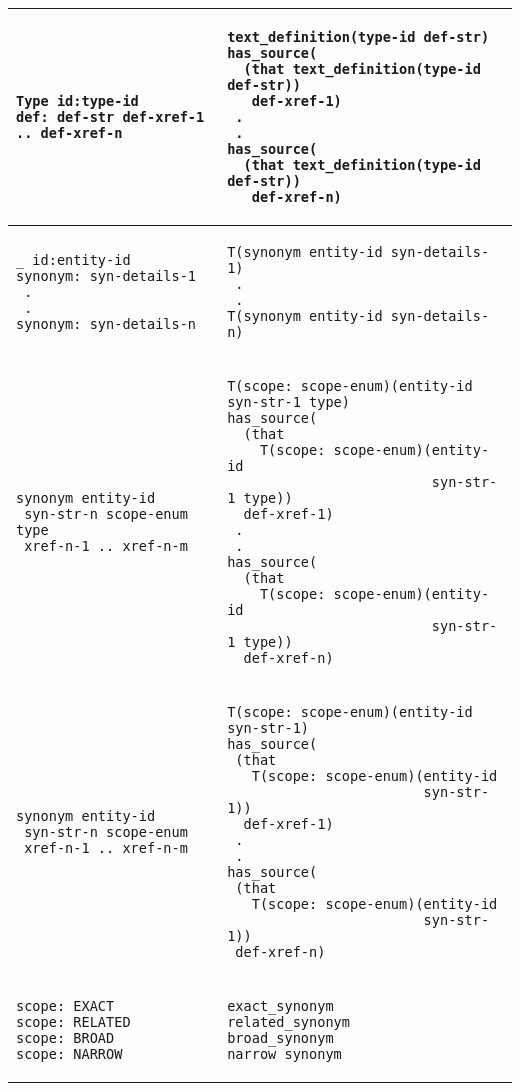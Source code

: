 \begin{scriptsize}
\begin{longtable}{ | p{7cm} | p{7cm} |}
\hline
\begin{verbatim}
Type id:type-id
def: def-str def-xref-1 .. def-xref-n
\end{verbatim}
&
\begin{verbatim}
text_definition(type-id def-str)
has_source( 
  (that text_definition(type-id def-str))
   def-xref-1)
 .
 .
has_source( 
  (that text_definition(type-id def-str)) 
   def-xref-n)
\end{verbatim}
\\

\hline
\begin{verbatim}
_ id:entity-id
synonym: syn-details-1
 .
 .
synonym: syn-details-n
\end{verbatim}
&
\begin{verbatim}
T(synonym entity-id syn-details-1)
 .
 .
T(synonym entity-id syn-details-n)
\end{verbatim}
\\

\hline
\begin{verbatim}
synonym entity-id 
 syn-str-n scope-enum type
 xref-n-1 .. xref-n-m
\end{verbatim}
&
\begin{verbatim}
T(scope: scope-enum)(entity-id syn-str-1 type)
has_source( 
  (that 
    T(scope: scope-enum)(entity-id 
                         syn-str-1 type)) 
  def-xref-1)
 .
 .
has_source( 
  (that 
    T(scope: scope-enum)(entity-id 
                         syn-str-1 type)) 
  def-xref-n)
\end{verbatim}
\\

\hline
\begin{verbatim}
synonym entity-id 
 syn-str-n scope-enum
 xref-n-1 .. xref-n-m
\end{verbatim}
&
\begin{verbatim}
T(scope: scope-enum)(entity-id syn-str-1)
has_source(
 (that 
   T(scope: scope-enum)(entity-id
                        syn-str-1))
  def-xref-1)
 .
 .
has_source( 
 (that 
   T(scope: scope-enum)(entity-id 
                        syn-str-1))
 def-xref-n)
\end{verbatim}
\\

\hline
\begin{verbatim}
scope: EXACT
scope: RELATED
scope: BROAD
scope: NARROW
\end{verbatim}
&
\begin{verbatim}
exact_synonym
related_synonym
broad_synonym
narrow_synonym
\end{verbatim}
\\


\end{longtable}
\end{scriptsize}
